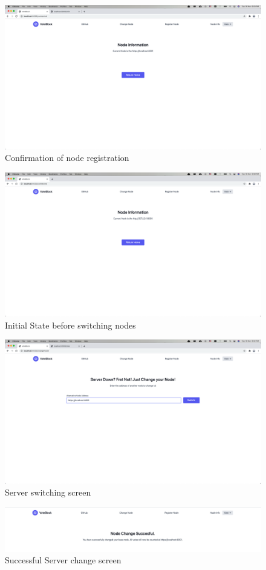 \documentclass{article}
\begin{document}
    \begin{figure}[h]
        \centering
        \includegraphics[width=1\textwidth]{registration_confirmation.png}
        \caption{Confirmation of node registration}
    \end{figure}
    \begin{figure}[h]
        \centering
        \includegraphics[width=1\textwidth]{node_before_change.png}
        \caption{Initial State before switching nodes}
    \end{figure}
    \begin{figure}[h]
        \centering
        \includegraphics[width=1\textwidth]{server_change.png}
        \caption{Server switching screen}
    \end{figure}
    \begin{figure}[h]
        \centering
        \includegraphics[width=1\textwidth]{success_server_change.png}
        \caption{Successful Server change screen}
    \end{figure}
\end{document}
